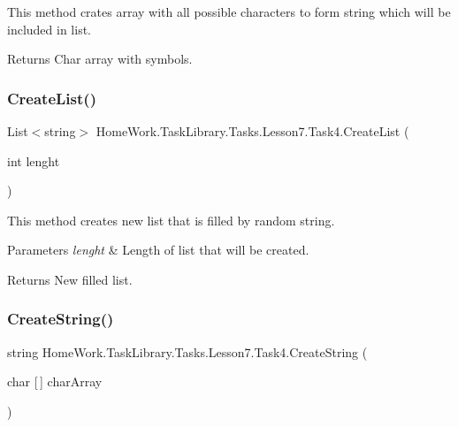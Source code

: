 This method crates array with all possible characters to form string which will be included in list. 

\begin{DoxyReturn}{Returns}
Char array with symbols.
\end{DoxyReturn}
\mbox{\label{class_home_work_1_1_task_library_1_1_tasks_1_1_lesson7_1_1_task4_ac6946078bd7a7a9d87213d1dfe6e3fec}} 
\subsubsection{\texorpdfstring{CreateList()}{CreateList()}}
{\footnotesize\ttfamily List$<$string$>$ Home\+Work.\+Task\+Library.\+Tasks.\+Lesson7.\+Task4.\+Create\+List (\begin{DoxyParamCaption}\item[{int}]{lenght }\end{DoxyParamCaption})\hspace{0.3cm}{\ttfamily [private]}}



This method creates new list that is filled by random string. 


\begin{DoxyParams}{Parameters}
{\em lenght} & Length of list that will be created.\\
\hline
\end{DoxyParams}
\begin{DoxyReturn}{Returns}
New filled list.
\end{DoxyReturn}
\mbox{\label{class_home_work_1_1_task_library_1_1_tasks_1_1_lesson7_1_1_task4_add270978e9d09fbe99016bb8a6d6775e}} 
\subsubsection{\texorpdfstring{CreateString()}{CreateString()}}
{\footnotesize\ttfamily string Home\+Work.\+Task\+Library.\+Tasks.\+Lesson7.\+Task4.\+Create\+String (\begin{DoxyParamCaption}\item[{char \mbox{[}$\,$\mbox{]}}]{char\+Array }\end{DoxyParamCaption})\hspace{0.3cm}{\ttfamily [private]}}



